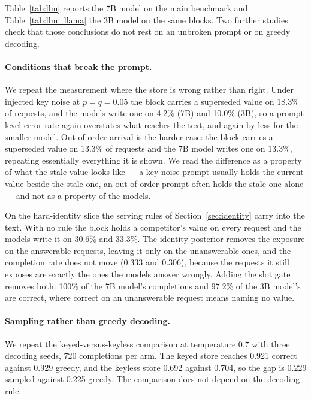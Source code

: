 \documentclass{article} %
\begin{document}
Table~\ref{tab:llm} reports the 7B model on the main benchmark and Table~\ref{tab:llm_llama} the 3B model on the same blocks. Two further studies check that those conclusions do not rest on an unbroken prompt or on greedy decoding.

\paragraph{Conditions that break the prompt.} We repeat the measurement where the store is wrong rather than right. Under injected key noise at $p=q=0.05$ the block carries a superseded value on 18.3\% of requests, and the models write one on 4.2\% (7B) and 10.0\% (3B), so a prompt-level error rate again overstates what reaches the text, and again by less for the smaller model. Out-of-order arrival is the harder case: the block carries a superseded value on 13.3\% of requests and the 7B model writes one on 13.3\%, repeating essentially everything it is shown. We read the difference as a property of what the stale value looks like --- a key-noise prompt usually holds the current value beside the stale one, an out-of-order prompt often holds the stale one alone --- and not as a property of the models.

On the hard-identity slice the serving rules of Section~\ref{sec:identity} carry into the text. With no rule the block holds a competitor's value on every request and the models write it on 30.6\% and 33.3\%. The identity posterior removes the exposure on the answerable requests, leaving it only on the unanswerable ones, and the completion rate does not move (0.333 and 0.306), because the requests it still exposes are exactly the ones the models answer wrongly. Adding the slot gate removes both: 100\% of the 7B model's completions and 97.2\% of the 3B model's are correct, where correct on an unanswerable request means naming no value.

\paragraph{Sampling rather than greedy decoding.} We repeat the keyed-versus-keyless comparison at temperature 0.7 with three decoding seeds, 720 completions per arm. The keyed store reaches 0.921 correct against 0.929 greedy, and the keyless store 0.692 against 0.704, so the gap is 0.229 sampled against 0.225 greedy. The comparison does not depend on the decoding rule.
\end{document}
